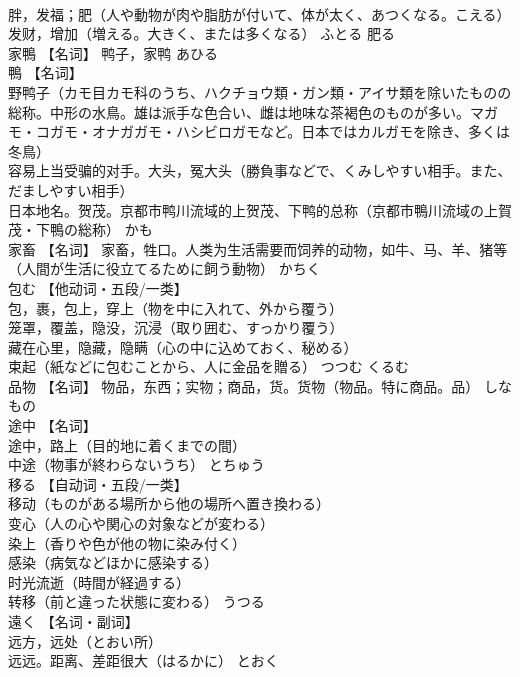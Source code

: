 \documentclass[8pt]{extreport}
\begin{document}
\begin{CJK}{UTF8}{min}
\\	胖，发福；肥（人や動物が肉や脂肪が付いて、体が太く、あつくなる。こえる） 
\\	发财，增加（増える。大きく、または多くなる）	ふとる	肥る
\\	家鴨	【名词】 鸭子，家鸭	あひる	
\\	鴨	【名词】 
\\	野鸭子（カモ目カモ科のうち、ハクチョウ類・ガン類・アイサ類を除いたものの総称。中形の水鳥。雄は派手な色合い、雌は地味な茶褐色のものが多い。マガモ・コガモ・オナガガモ・ハシビロガモなど。日本ではカルガモを除き、多くは冬鳥） 
\\	容易上当受骗的对手。大头，冤大头（勝負事などで、くみしやすい相手。また、だましやすい相手） 
\\	日本地名。贺茂。京都市鸭川流域的上贺茂、下鸭的总称（京都市鴨川流域の上賀茂・下鴨の総称）	かも	
\\	家畜	【名词】 家畜，牲口。人类为生活需要而饲养的动物，如牛、马、羊、猪等（人間が生活に役立てるために飼う動物）	かちく	
\\	包む	【他动词・五段/一类】 
\\	包，裹，包上，穿上（物を中に入れて、外から覆う） 
\\	笼罩，覆盖，隐没，沉浸（取り囲む、すっかり覆う） 
\\	藏在心里，隐藏，隐瞒（心の中に込めておく、秘める） 
\\	束起（紙などに包むことから、人に金品を贈る）	つつむ くるむ	
\\	品物	【名词】 物品，东西；实物；商品，货。货物（物品。特に商品。品）	しなもの	
\\	途中	【名词】 
\\	途中，路上（目的地に着くまでの間） 
\\	中途（物事が終わらないうち）	とちゅう	
\\	移る	【自动词・五段/一类】 
\\	移动（ものがある場所から他の場所へ置き換わる） 
\\	变心（人の心や関心の対象などが変わる） 
\\	染上（香りや色が他の物に染み付く） 
\\	感染（病気などほかに感染する） 
\\	时光流逝（時間が経過する） 
\\	转移（前と違った状態に変わる）	うつる	
\\	遠く	【名词・副词】 
\\	远方，远处（とおい所） 
\\	远远。距离、差距很大（はるかに）	とおく	

\end{CJK}
\end{document}
